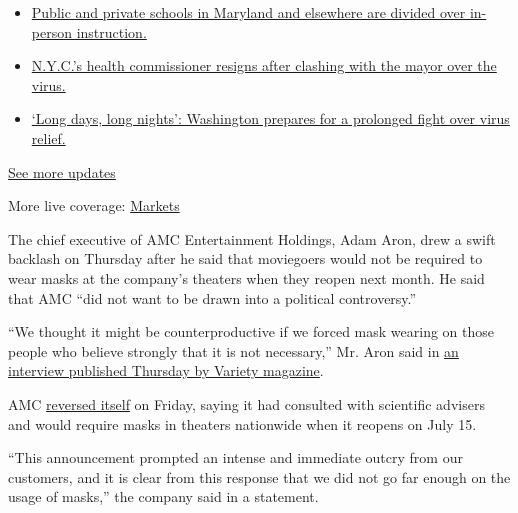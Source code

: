 \begin{itemize}
\tightlist
\item
  \href{https://www.nytimes.com/2020/08/04/world/coronavirus-cases.html?action=click\&pgtype=Article\&state=default\&region=MAIN_CONTENT_1\&context=storylines_live_updates\#link-4825b93}{Public
  and private schools in Maryland and elsewhere are divided over
  in-person instruction.}
\item
  \href{https://www.nytimes.com/2020/08/04/world/coronavirus-cases.html?action=click\&pgtype=Article\&state=default\&region=MAIN_CONTENT_1\&context=storylines_live_updates\#link-4d1eafa8}{N.Y.C.'s
  health commissioner resigns after clashing with the mayor over the
  virus.}
\item
  \href{https://www.nytimes.com/2020/08/04/world/coronavirus-cases.html?action=click\&pgtype=Article\&state=default\&region=MAIN_CONTENT_1\&context=storylines_live_updates\#link-6b644638}{`Long
  days, long nights': Washington prepares for a prolonged fight over
  virus relief.}
\end{itemize}

\href{https://www.nytimes.com/2020/08/04/world/coronavirus-cases.html?action=click\&pgtype=Article\&state=default\&region=MAIN_CONTENT_1\&context=storylines_live_updates}{See
more updates}

More live coverage:
\href{https://www.nytimes.com/live/2020/08/04/business/stock-market-today-coronavirus?action=click\&pgtype=Article\&state=default\&region=MAIN_CONTENT_1\&context=storylines_live_updates}{Markets}

The chief executive of AMC Entertainment Holdings, Adam Aron, drew a
swift backlash on Thursday after he said that moviegoers would not be
required to wear masks at the company's theaters when they reopen next
month. He said that AMC ``did not want to be drawn into a political
controversy.''

``We thought it might be counterproductive if we forced mask wearing on
those people who believe strongly that it is not necessary,'' Mr. Aron
said in
\href{https://variety.com/2020/film/news/amc-coronavirus-movie-theaters-covid-19-1234642047/}{an
interview published Thursday by Variety magazine}.

AMC
\href{https://www.nytimes.com/2020/06/18/business/AMC-theaters-masks-coronavirus.html}{reversed
itself} on Friday, saying it had consulted with scientific advisers and
would require masks in theaters nationwide when it reopens on July 15.

``This announcement prompted an intense and immediate outcry from our
customers, and it is clear from this response that we did not go far
enough on the usage of masks,'' the company said in a statement.

